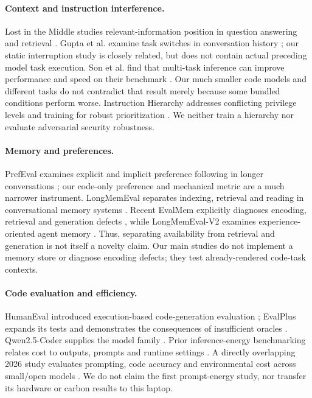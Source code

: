 \documentclass[10pt,a4paper,twocolumn]{article}
\begin{document}
\paragraph{Context and instruction interference.}
Lost in the Middle studies relevant-information position in question answering
and retrieval \citep{lost}. Gupta et al. examine task switches in conversation
history \citep{interference}; our static interruption study is closely related,
but does not contain actual preceding model task execution. Son et al. find
that multi-task inference can improve performance and speed on their benchmark
\citep{multitask}. Our much smaller code models and different tasks do not
contradict that result merely because some bundled conditions perform worse.
Instruction Hierarchy addresses conflicting privilege levels and training for
robust prioritization \citep{hierarchy}. We neither train a hierarchy nor
evaluate adversarial security robustness.

\paragraph{Memory and preferences.}
PrefEval examines explicit and implicit preference following in longer
conversations \citep{prefeval}; our code-only preference and mechanical metric
are a much narrower instrument. LongMemEval separates indexing, retrieval and
reading in conversational memory systems \citep{longmem}. Recent EvalMem
explicitly diagnoses encoding, retrieval and generation defects
\citep{evalmem}, while LongMemEval-V2 examines experience-oriented agent memory
\citep{longmemv2}. Thus, separating availability from retrieval and generation
is not itself a novelty claim. Our main studies do not implement a memory store
or diagnose encoding defects; they test already-rendered code-task contexts.

\paragraph{Code evaluation and efficiency.}
HumanEval introduced execution-based code-generation evaluation
\citep{humaneval}; EvalPlus expands its tests and demonstrates the consequences
of insufficient oracles \citep{evalplus}. Qwen2.5-Coder supplies the model
family \citep{qwen}. Prior inference-energy benchmarking relates cost to
outputs, prompts and runtime settings \citep{sustainable}. A directly
overlapping 2026 study evaluates prompting, code accuracy and environmental
cost across small/open models \citep{slmenergy}. We do not claim the first
prompt-energy study, nor transfer its hardware or carbon results to this laptop.
\end{document}
